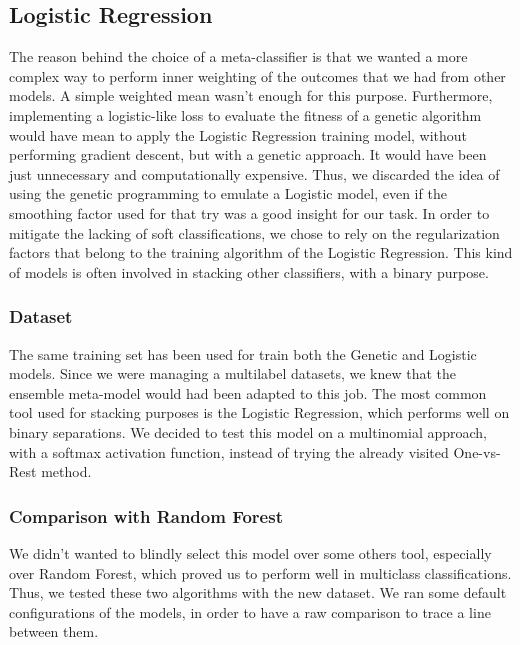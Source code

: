 \subsection{Logistic Regression}
The reason behind the choice of a meta-classifier is that we wanted a more complex way to perform inner weighting of the outcomes that we had from other models.
A simple weighted mean wasn't enough for this purpose. Furthermore, implementing a logistic-like loss to evaluate the fitness of a genetic algorithm would have mean to apply the Logistic Regression training model, without performing gradient descent, but with a genetic approach. It would have been just unnecessary and computationally expensive.
Thus, we discarded the idea of using the genetic programming to emulate a Logistic model, even if the smoothing factor used for that try was a good insight for our task.
In order to mitigate the lacking of soft classifications, we chose to rely on the regularization factors that belong to the training algorithm of the Logistic Regression.
This kind of models is often involved in stacking other classifiers, with a binary purpose.

\subsubsection{Dataset}
The same training set has been used for train both the Genetic and Logistic models.
Since we were managing a multilabel datasets, we knew that the ensemble meta-model would had been adapted to this job. The most common tool used for stacking purposes is the Logistic Regression, which performs well on binary separations. We decided to test this model on a multinomial approach, with a softmax activation function, instead of trying the already visited One-vs-Rest method.

\subsubsection{Comparison with Random Forest}
We didn't wanted to blindly select this model over some others tool, especially over Random Forest, which proved us to perform well in multiclass classifications.
Thus, we tested these two algorithms with the new dataset.
We ran some default configurations of the models, in order to have a raw comparison to trace a line between them.

